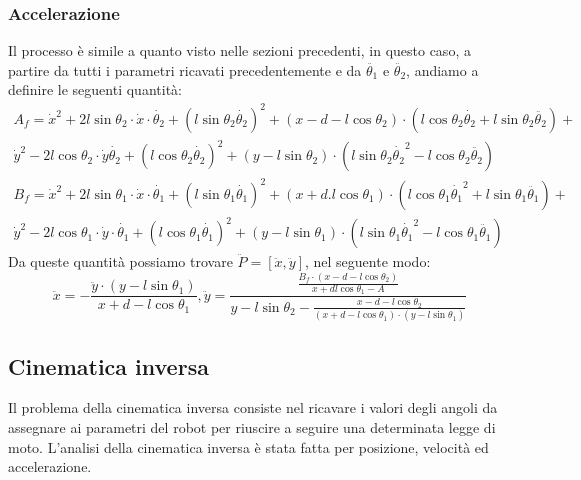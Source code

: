 \subsubsection{Accelerazione}
Il processo è simile a quanto visto nelle sezioni precedenti, in questo caso, a partire da tutti i parametri ricavati precedentemente e da $\ddot{\theta_1}$ e $\ddot{\theta_2}$, andiamo a definire le seguenti quantità:
\begin{equation*}
\begin{aligned}
    A_{f} = \dot{x}^2 + 2l\sin\theta_2\cdot\dot{x}\cdot\dot{\theta_2}+(l\sin\theta_2\dot{\theta_2})^2 + (x-d-l\cos\theta_2)\cdot(l\cos\theta_2\dot{\theta_2}+l\sin\theta_2\ddot{\theta_2}) +\\ \dot{y}^2-2l\cos\theta_2\cdot\dot{y}\dot{\theta_2}+(l\cos\theta_2\dot{\theta_2})^2+(y-l\sin\theta_2)\cdot(l\sin\theta_2\dot{\theta_2}^2-l\cos\theta_2\ddot{\theta_2})
    \end{aligned}
\end{equation*}
\begin{equation*}
    \begin{aligned}
    B_{f} = \dot{x}^2+2l\sin\theta_1\cdot\dot{x}\cdot\dot{\theta_1} + (l\sin\theta_1\dot{\theta_1})^2+(x+d.l\cos\theta_1)\cdot(l\cos\theta_1\dot{\theta_1}^2+l\sin\theta_1\ddot{\theta_1})+
    \\ \dot{y}^2 -2l\cos\theta_1\cdot \dot{y}\cdot\dot{\theta_1}+(l\cos\theta_1\dot{\theta_1})^2+(y-l\sin\theta_1)\cdot(l\sin\theta_1\dot{\theta_1}^2-l\cos\theta_1\ddot{\theta_1})
    \end{aligned}
\end{equation*}
Da queste quantità possiamo trovare $\ddot{P} = [\ddot{x},\ddot{y}]$, nel seguente modo:
\begin{equation}
    \ddot{x} = -\frac{\ddot{y}\cdot(y-l\sin\theta_1)}{x+d-l\cos\theta_1}, \ddot{y} = \frac{\frac{B_{f}\cdot(x-d-l\cos\theta_2)}{x+dl\cos\theta_1-A}}{y-l\sin\theta_2-\frac{x-d-l\cos\theta_2}{(x+d-l\cos\theta_1)\cdot(y-l\sin\theta_1)}}
\end{equation}
\subsection{Cinematica inversa}
Il problema della cinematica inversa consiste nel ricavare i valori degli angoli da assegnare ai parametri del robot per riuscire a seguire una determinata legge di moto. L'analisi della cinematica inversa è stata fatta per posizione, velocità ed accelerazione.
